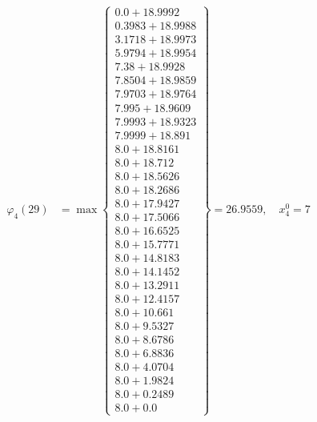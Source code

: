 \documentclass{article}
\begin{document}
\begin{align*}
  
\varphi_{4}(29) &= \max \left\{ \begin{array}{c}
0.0 + 18.9992 \\
 0.3983 + 18.9988 \\
 3.1718 + 18.9973 \\
 5.9794 + 18.9954 \\
 7.38 + 18.9928 \\
 7.8504 + 18.9859 \\
 7.9703 + 18.9764 \\
 7.995 + 18.9609 \\
 7.9993 + 18.9323 \\
 7.9999 + 18.891 \\
 8.0 + 18.8161 \\
 8.0 + 18.712 \\
 8.0 + 18.5626 \\
 8.0 + 18.2686 \\
 8.0 + 17.9427 \\
 8.0 + 17.5066 \\
 8.0 + 16.6525 \\
 8.0 + 15.7771 \\
 8.0 + 14.8183 \\
 8.0 + 14.1452 \\
 8.0 + 13.2911 \\
 8.0 + 12.4157 \\
 8.0 + 10.661 \\
 8.0 + 9.5327 \\
 8.0 + 8.6786 \\
 8.0 + 6.8836 \\
 8.0 + 4.0704 \\
 8.0 + 1.9824 \\
 8.0 + 0.2489 \\
 8.0 + 0.0
\end{array} \right\}=26.9559,\quad x_{4}^0=7\\
  
  
  

\end{align*}
\end{document}
